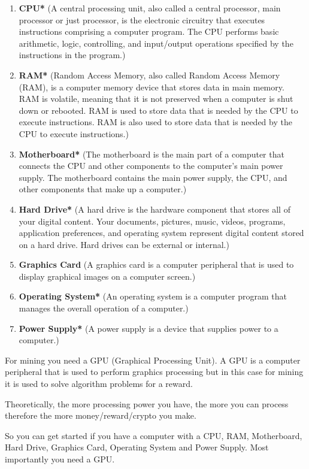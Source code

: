 \begin{enumerate}
\item \textbf{CPU*} (A central processing unit, also called a central processor, main processor or just processor, is the electronic circuitry that executes instructions comprising a computer program. The CPU performs basic arithmetic, logic, controlling, and input/output operations specified by the instructions in the program.)
\item \textbf{RAM*} (Random Access Memory, also called Random Access Memory (RAM), is a computer memory device that stores data in main memory. RAM is volatile, meaning that it is not preserved when a computer is shut down or rebooted. RAM is used to store data that is needed by the CPU to execute instructions. RAM is also used to store data that is needed by the CPU to execute instructions.)
\item \textbf{Motherboard*} (The motherboard is the main part of a computer that connects the CPU and other components to the computer's main power supply. The motherboard contains the main power supply, the CPU, and other components that make up a computer.)
\item \textbf{Hard Drive*}  (A hard drive is the hardware component that stores all of your digital content. Your documents, pictures, music, videos, programs, application preferences, and operating system represent digital content stored on a hard drive. Hard drives can be external or internal.)
\item \textbf{Graphics Card} (A graphics card is a computer peripheral that is used to display graphical images on a computer screen.)
\item \textbf{Operating System*} (An operating system is a computer program that manages the overall operation of a computer.)
\item \textbf{Power Supply*} (A power supply is a device that supplies power to a computer.)
\end{enumerate}

For mining you need a GPU (Graphical Processing Unit). A GPU is a computer peripheral that is used to perform graphics processing but in this case for mining it is used to solve algorithm problems for a reward.

Theoretically, the more processing power you have, the more you can process therefore the more money/reward/crypto you make.

So you can get started if you have a computer with a CPU, RAM, Motherboard, Hard Drive, Graphics Card, Operating System and Power Supply. Most importantly you need a GPU. \\

